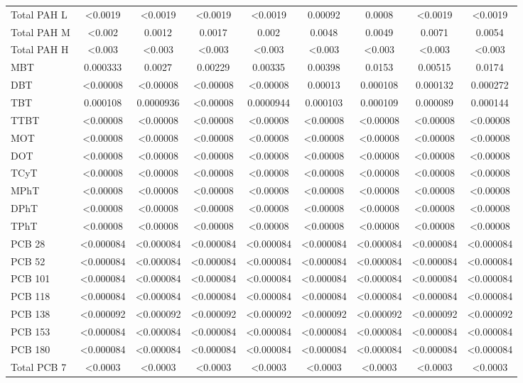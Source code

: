 \documentclass[algorithms,article,submit,pdftex,moreauthors]{Definitions/mdpi}
\begin{document}
\begin{scriptsize}
\begin{center}
\begin{longtable}{@{\extracolsep{\fill}}|p{1.8cm}|cccccccc|@{}}
Total PAH L & <0.0019 & <0.0019 & <0.0019 & <0.0019 & 0.00092 & 0.0008 & <0.0019 & <0.0019 \\
Total PAH M & <0.002 & 0.0012 & 0.0017 & 0.002 & 0.0048 & 0.0049 & 0.0071 & 0.0054 \\
Total PAH H & <0.003 & <0.003 & <0.003 & <0.003 & <0.003 & <0.003 & <0.003 & <0.003 \\
MBT & 0.000333 & 0.0027 & 0.00229 & 0.00335 & 0.00398 & 0.0153 & 0.00515 & 0.0174 \\
DBT & <0.00008 & <0.00008 & <0.00008 & <0.00008 & 0.00013 & 0.000108 & 0.000132 & 0.000272 \\
TBT & 0.000108 & 0.0000936 & <0.00008 & 0.0000944 & 0.000103 & 0.000109 & 0.000089 & 0.000144 \\
TTBT & <0.00008 & <0.00008 & <0.00008 & <0.00008 & <0.00008 & <0.00008 & <0.00008 & <0.00008 \\
MOT & <0.00008 & <0.00008 & <0.00008 & <0.00008 & <0.00008 & <0.00008 & <0.00008 & <0.00008 \\
DOT & <0.00008 & <0.00008 & <0.00008 & <0.00008 & <0.00008 & <0.00008 & <0.00008 & <0.00008 \\
TCyT & <0.00008 & <0.00008 & <0.00008 & <0.00008 & <0.00008 & <0.00008 & <0.00008 & <0.00008 \\
MPhT & <0.00008 & <0.00008 & <0.00008 & <0.00008 & <0.00008 & <0.00008 & <0.00008 & <0.00008 \\
DPhT & <0.00008 & <0.00008 & <0.00008 & <0.00008 & <0.00008 & <0.00008 & <0.00008 & <0.00008 \\
TPhT & <0.00008 & <0.00008 & <0.00008 & <0.00008 & <0.00008 & <0.00008 & <0.00008 & <0.00008 \\
PCB 28 & <0.000084 & <0.000084 & <0.000084 & <0.000084 & <0.000084 & <0.000084 & <0.000084 & <0.000084  \\
PCB 52 & <0.000084 & <0.000084 & <0.000084 & <0.000084 & <0.000084 & <0.000084 & <0.000084 & <0.000084  \\
PCB 101 & <0.000084 & <0.000084 & <0.000084 & <0.000084 & <0.000084 & <0.000084 & <0.000084 & <0.000084  \\
PCB 118 & <0.000084 & <0.000084 & <0.000084 & <0.000084 & <0.000084 & <0.000084 & <0.000084 & <0.000084  \\
PCB 138 & <0.000092 & <0.000092 & <0.000092 & <0.000092 & <0.000092 & <0.000092 & <0.000092 & <0.000092 \\
PCB 153 & <0.000084 & <0.000084 & <0.000084 & <0.000084 & <0.000084 & <0.000084 & <0.000084 & <0.000084  \\
PCB 180 & <0.000084 & <0.000084 & <0.000084 & <0.000084 & <0.000084 & <0.000084 & <0.000084 & <0.000084  \\
Total PCB 7 & <0.0003 & <0.0003 & <0.0003 & <0.0003 & <0.0003 & <0.0003 & <0.0003 & <0.0003  \\
%
\end{longtable}
\end{center}
\end{scriptsize}
\end{document}
